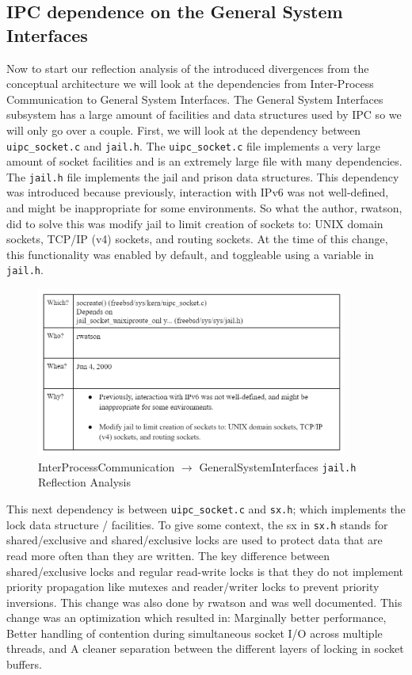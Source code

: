 \documentclass[12pt, dvipsnames, a4paper]{article}
\newcommand{\code}[1]{\texttt{#1}}
\begin{document}
\subsection{IPC dependence on the General System Interfaces}
Now to start our reflection analysis of the introduced divergences from the conceptual architecture  we will look at the dependencies from Inter-Process Communication to General System Interfaces. The General System Interfaces subsystem has a large amount of facilities and data structures used by IPC so we will only go over a couple. First, we will look at the dependency between \code{uipc\_socket.c} and \code{jail.h}. The \code{uipc\_socket.c} file implements a very large amount of socket facilities and is an extremely large file with many dependencies. The \code{jail.h} file implements the jail and prison data structures. This dependency was introduced because previously, interaction with IPv6 was not well-defined, and might be inappropriate for some environments. So what the author, rwatson, did to solve this was modify jail to limit creation of sockets to: UNIX domain sockets, TCP/IP (v4) sockets, and routing sockets. At the time of this change, this functionality was enabled by default, and toggleable using a variable in \code{jail.h}.
\begin{figure}[!htb]
	\centering
	\includegraphics[width=290pt]{assets/IPC_Jail.png}
	\caption{InterProcessCommunication $\longrightarrow$ GeneralSystemInterfaces \code{jail.h} Reflection Analysis}
\end{figure}

This next dependency is between \code{uipc\_socket.c} and \code{sx.h}; which implements the lock data structure / facilities. To give some context, the sx in \code{sx.h} stands for shared/exclusive and shared/exclusive locks are used to protect data that are read more often than they are written. The key difference between shared/exclusive locks and regular read-write locks is that they do not implement priority propagation like mutexes and reader/writer locks to prevent priority inversions. This change was also done by rwatson and was well documented. This change was an optimization which resulted in: Marginally better performance, Better handling of contention during simultaneous socket I/O across multiple threads, and A cleaner separation between the different layers of locking in socket buffers.
\end{document}
